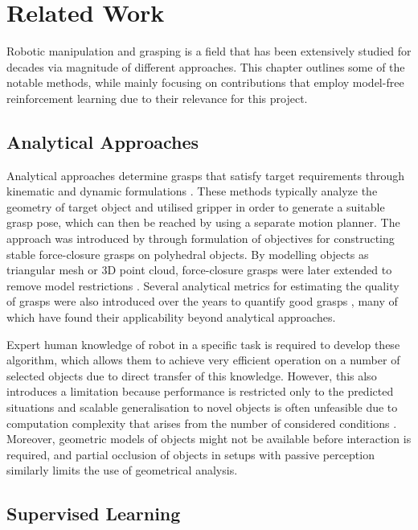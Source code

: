 \chapter{Related Work}\label{ch:related_work}

Robotic manipulation and grasping is a field that has been extensively studied for decades via magnitude of different approaches. This chapter outlines some of the notable methods, while mainly focusing on contributions that employ model-free reinforcement learning due to their relevance for this project.


\section{Analytical Approaches}

Analytical approaches determine grasps that satisfy target requirements through kinematic and dynamic formulations \cite{sahbani_overview_2012}. These methods typically analyze the geometry of target object and utilised gripper in order to generate a suitable grasp pose, which can then be reached by using a separate motion planner. The approach was introduced by \citet{nguyen_constructing_1987} through formulation of objectives for constructing stable force-closure grasps on polyhedral objects. By modelling objects as triangular mesh or 3D point cloud, force-closure grasps were later extended to remove model restrictions \cite{yun-hui_liu_complete_2004}. Several analytical metrics for estimating the quality of grasps were also introduced over the years to quantify good grasps \cite{roa_grasp_2015}, many of which have found their applicability beyond analytical approaches.

Expert human knowledge of robot in a specific task is required to develop these algorithm, which allows them to achieve very efficient operation on a number of selected objects due to direct transfer of this knowledge. However, this also introduces a limitation because performance is restricted only to the predicted situations and scalable generalisation to novel objects is often unfeasible due to computation complexity that arises from the number of considered conditions \cite{sahbani_overview_2012}. Moreover, geometric models of objects might not be available before interaction is required, and partial occlusion of objects in setups with passive perception similarly limits the use of geometrical analysis.


\section{Supervised Learning}


